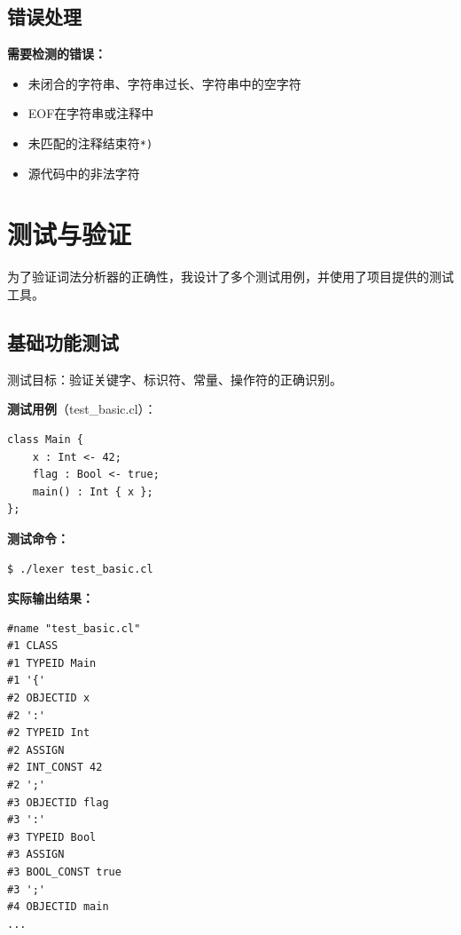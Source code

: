\documentclass[twocolumn]{article}
\begin{document}
\textcolor{red}{%
}

\subsection{错误处理}

\textbf{需要检测的错误：}
\begin{itemize}
    \item 未闭合的字符串、字符串过长、字符串中的空字符
    \item EOF在字符串或注释中
    \item 未匹配的注释结束符\texttt{*)}
    \item 源代码中的非法字符
\end{itemize}

\textcolor{red}{%
}

\section{测试与验证}
为了验证词法分析器的正确性，我设计了多个测试用例，并使用了项目提供的测试工具。

\subsection{基础功能测试}

测试目标：验证关键字、标识符、常量、操作符的正确识别。

\textcolor{red}{%
}

\textbf{测试用例}（test\_basic.cl）：
\begin{lstlisting}[language=cool, caption={基础功能测试}]
class Main {
    x : Int <- 42;
    flag : Bool <- true;
    main() : Int { x };
};
\end{lstlisting}

\textbf{测试命令：}
\begin{verbatim}
$ ./lexer test_basic.cl
\end{verbatim}

\textbf{实际输出结果：}
\textcolor{red}{%
}
\begin{verbatim}
#name "test_basic.cl"
#1 CLASS
#1 TYPEID Main
#1 '{'
#2 OBJECTID x
#2 ':'
#2 TYPEID Int
#2 ASSIGN
#2 INT_CONST 42
#2 ';'
#3 OBJECTID flag
#3 ':'
#3 TYPEID Bool
#3 ASSIGN
#3 BOOL_CONST true
#3 ';'
#4 OBJECTID main
...
\end{verbatim}
\end{document}
